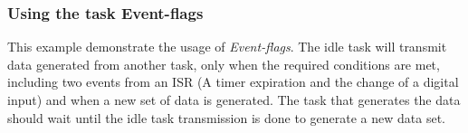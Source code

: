 \subsubsection{Using the task Event-flags}
This example demonstrate the usage of \textit{Event-flags}. The idle task will transmit data generated from another task, only when the required conditions are met, including two events from an ISR (A timer expiration and the change of a digital input) and when a new set of data is generated.
The task that generates the data should wait until the idle task transmission is done to generate a new data set. 
\medskip



\newpage

